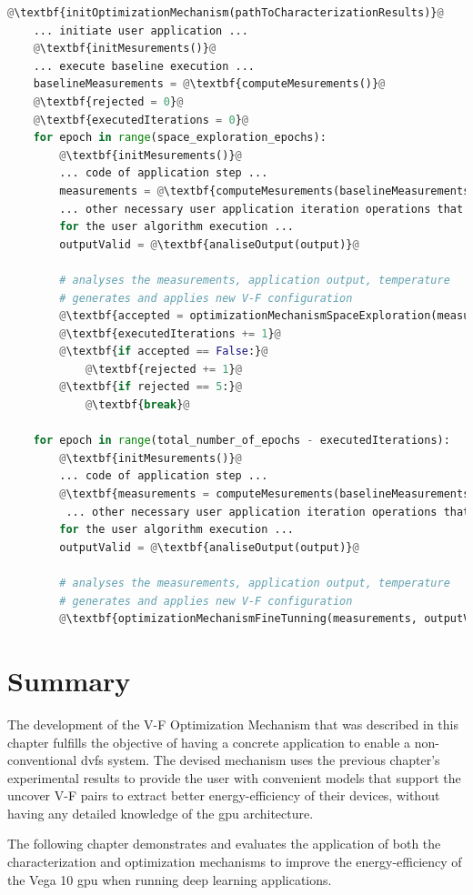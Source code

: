 \begin{lstlisting}[language=Python, caption=Example of usage of V-F Optimization Mechanism Library. Bold statements represents the added programming elements for the mechanism, label=lst:wrapper, basicstyle=\footnotesize\ttfamily,abovecaptionskip=0pt, captionpos=b,escapechar=@]
    @\textbf{initOptimizationMechanism(pathToCharacterizationResults)}@
    ... initiate user application ...
    @\textbf{initMesurements()}@
    ... execute baseline execution ...
    baselineMeasurements = @\textbf{computeMesurements()}@
    @\textbf{rejected = 0}@
    @\textbf{executedIterations = 0}@
    for epoch in range(space_exploration_epochs):
        @\textbf{initMesurements()}@
        ... code of application step ...
        measurements = @\textbf{computeMesurements(baselineMeasurements)}@
        ... other necessary user application iteration operations that do not account
        for the user algorithm execution ...
        outputValid = @\textbf{analiseOutput(output)}@
        
        # analyses the measurements, application output, temperature
        # generates and applies new V-F configuration
        @\textbf{accepted = optimizationMechanismSpaceExploration(measurements, outputValid)}@
        @\textbf{executedIterations += 1}@
        @\textbf{if accepted == False:}@
            @\textbf{rejected += 1}@
        @\textbf{if rejected == 5:}@
            @\textbf{break}@
    
    for epoch in range(total_number_of_epochs - executedIterations):
        @\textbf{initMesurements()}@
        ... code of application step ...
        @\textbf{measurements = computeMesurements(baselineMeasurements)}@
         ... other necessary user application iteration operations that do not account
        for the user algorithm execution ...
        outputValid = @\textbf{analiseOutput(output)}@
        
        # analyses the measurements, application output, temperature
        # generates and applies new V-F configuration
        @\textbf{optimizationMechanismFineTunning(measurements, outputValid)}@
\end{lstlisting}





\section{Summary}

The development of the V-F Optimization Mechanism that was described in this chapter fulfills the objective of having a concrete application to enable a non-conventional \acrshort{dvfs} system. The devised mechanism uses the previous chapter's experimental results to provide the user with convenient models that support the uncover V-F pairs to extract better energy-efficiency of their devices, without having any detailed knowledge of the \acrshort{gpu} architecture.

The following chapter demonstrates and evaluates the application of both the characterization and optimization mechanisms to improve the energy-efficiency of the Vega 10 \acrshort{gpu} when running deep learning applications.


